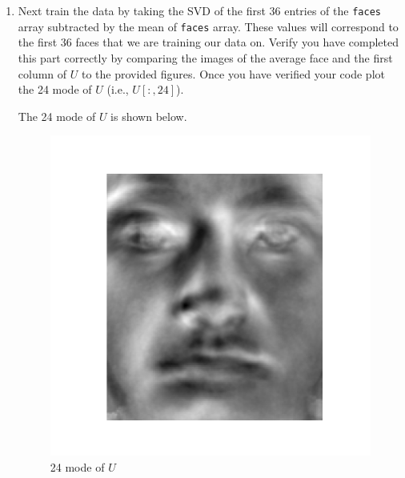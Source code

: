 \begin{enumerate}[label=\arabic*.]
    \item Next train the data by taking the SVD of the first 36 entries of
        the \texttt{faces} array subtracted by the mean of \texttt{faces}
        array. These values will correspond to the first 36 faces that we
        are training our data on. Verify you have completed this part
        correctly by comparing the images of the average face and the first
        column of $U$ to the provided figures. Once you have verified your
        code plot the 24 mode of $U$ (i.e., $U[:,24]$).
        \begin{mdframed}[style=MyFrame]
            The 24 mode of $U$ is shown below.
            \begin{figure}[H]
                \includegraphics[height=0.35\textheight]{../media/mode-24.png}
                \caption{24 mode of $U$}
            \end{figure}
        \end{mdframed}


\end{enumerate}
